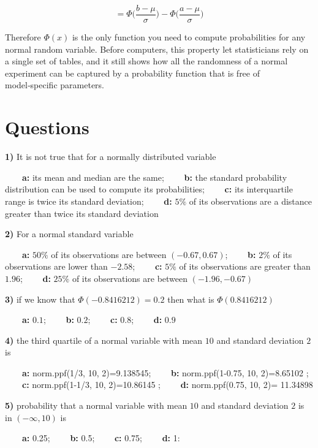\documentclass[
]{book}
\begin{document}
\[=\Phi \big(\frac{b-\mu}{\sigma}\big)-\Phi \big(\frac{a-\mu}{\sigma}\big)\]

Therefore \(\Phi(x)\) is the only function you need to compute probabilities for any normal random variable. Before computers, this property let statisticians rely on a single set of tables, and it still shows how all the randomness of a normal experiment can be captured by a probability function that is free of model‑specific parameters.

\hypertarget{questions-6}{%
\section{Questions}\label{questions-6}}

\textbf{1)} It is not true that for a normally distributed variable

\textbf{\(\qquad\)a:} its mean and median are the same; \textbf{\(\qquad\)b:} the standard probability distribution can be used to compute its probabilities; \textbf{\(\qquad\)c:} its interquartile range is twice its standard deviation; \textbf{\(\qquad\)d:} \(5\%\) of its observations are a distance greater than twice its standard deviation

\textbf{2)} For a normal standard variable

\textbf{\(\qquad\)a:} \(50\%\) of its observations are between \((-0.67,0.67)\);
\textbf{\(\qquad\)b:} \(2\%\) of its observations are lower than \(-2.58\);
\textbf{\(\qquad\)c:} \(5\%\) of its observations are greater than \(1.96\);
\textbf{\(\qquad\)d:} \(25\%\) of its observations are between \((-1.96,-0.67)\)

\textbf{3)} if we know that \(\Phi(-0.8416212)=0.2\) then what is \(\Phi(0.8416212)\)

\textbf{\(\qquad\)a:} \(0.1\);
\textbf{\(\qquad\)b:} \(0.2\);
\textbf{\(\qquad\)c:} \(0.8\);
\textbf{\(\qquad\)d:} \(0.9\)

\textbf{4)} the third quartile of a normal variable with mean \(10\) and standard deviation \(2\) is

\textbf{\(\qquad\)a:} norm.ppf(1/3, 10, 2)=9.138545;
\textbf{\(\qquad\)b:} norm.ppf(1-0.75, 10, 2)=8.65102 ;
\textbf{\(\qquad\)c:} norm.ppf(1-1/3, 10, 2)=10.86145 ;
\textbf{\(\qquad\)d:} norm.ppf(0.75, 10, 2)= 11.34898

\textbf{5)} probability that a normal variable with mean \(10\) and standard deviation \(2\) is in \((-\infty,10)\) is

\textbf{\(\qquad\)a:} 0.25;
\textbf{\(\qquad\)b:} 0.5;
\textbf{\(\qquad\)c:} 0.75;
\textbf{\(\qquad\)d:} 1:
\end{document}
